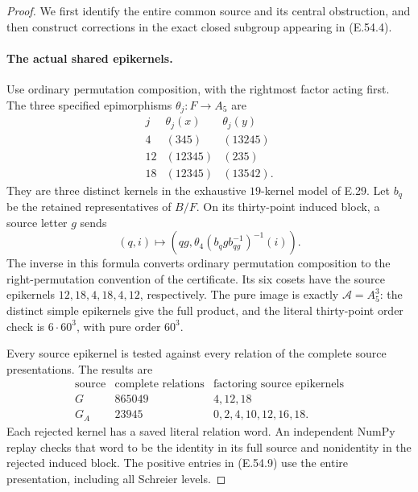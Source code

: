 \begin{proof}
We first identify the entire common source and its central
obstruction, and then construct corrections in the exact
closed subgroup appearing in \textup{(E.54.4)}.

\paragraph{The actual shared epikernels.}
Use ordinary permutation composition, with the rightmost
factor acting first.  The three specified epimorphisms
$\theta_j:F\to A_5$ are
\[
\begin{array}{c|c|c}
 j&\theta_j(x)&\theta_j(y)\\\hline
 4&(345)&(13245)\\
 12&(12345)&(235)\\
 18&(12345)&(13542).
\end{array}
 \tag{E.54.7}
\]
They are three distinct kernels in the exhaustive $19$-kernel
model of E.29.  Let $b_q$ be the retained representatives of
$B/F$.  On its thirty-point induced block, a source letter
$g$ sends
\[
 (q,i)\longmapsto
 \left(qg,\theta_4(b_qgb_{qg}^{-1})^{-1}(i)\right).
 \tag{E.54.8}
\]
The inverse in this formula converts ordinary permutation
composition to the right-permutation convention of the
certificate.  Its six cosets have the source epikernels
$12,18,4,18,4,12$, respectively.  The pure image is exactly
$\mathcal A=A_5^3$: the distinct simple epikernels give the
full product, and the literal thirty-point order check is
$6\cdot60^3$, with pure order $60^3$.

Every source epikernel is tested against every relation of
the complete source presentations.  The results are
\[
\begin{array}{c|r|l}
 \text{source}&\text{complete relations}&
                    \text{factoring source epikernels}\\\hline
 G&865049&4,12,18\\
 G_A&23945&0,2,4,10,12,16,18.
\end{array}
 \tag{E.54.9}
\]
Each rejected kernel has a saved literal relation word.
An independent NumPy replay checks that word to be the
identity in its full source and nonidentity in the rejected
induced block.  The positive entries in
\textup{(E.54.9)} use the entire presentation, including all
Schreier levels.


\end{proof}
